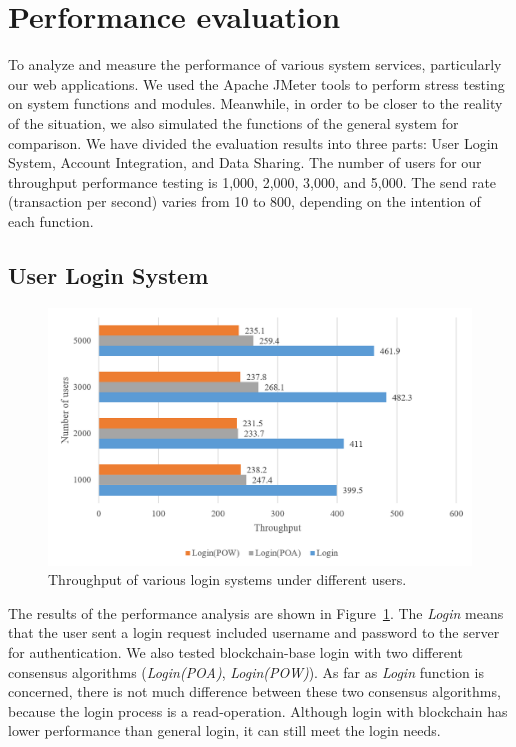 \section{Performance evaluation}
To analyze and measure the performance of various system services, particularly our web applications. We used the Apache JMeter tools to perform stress testing on system functions and modules. Meanwhile, in order to be closer to the reality of the situation, we also simulated the functions of the general system for comparison. We have divided the evaluation results into three parts: User Login System, Account Integration, and Data Sharing. The number of users for our throughput performance testing is 1,000, 2,000, 3,000, and 5,000. The send rate (transaction per second) varies from 10 to 800, depending on the intention of each function.


\subsection*{User Login System}
\begin{figure}[htb]
    \centering
    \includegraphics[height=!,width=0.9\linewidth,keepaspectratio=true]{figures/login-throughput.png}
    \caption{{\footnotesize Throughput of various login systems under different users.}}
    \label{fig:loginThroughput}
\end{figure}
The results of the performance analysis are shown in Figure~\ref{fig:loginThroughput}. The \textit{Login} means that the user sent a login request included username and password to the server for authentication. We also tested blockchain-base login with two different consensus algorithms (\textit{Login(POA)}, \textit{Login(POW)}). As far as \textit{Login} function is concerned, there is not much difference between these two consensus algorithms, because the login process is a read-operation. Although login with blockchain has lower performance than general login, it can still meet the login needs.
\newpage

